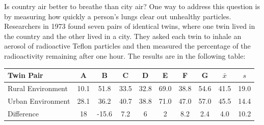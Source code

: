 \documentclass[11pt]{exam}
\begin{document}
\begin{questions}



\newpage

\question Is country air better to breathe than city air? One way to address this question is by measuring how quickly a person's lungs clear out unhealthy particles.  Researchers in 1973 found seven pairs of identical twins, where one twin lived in the country and the other lived in a city.  They asked each twin to inhale an aerosol of radioactive Teflon particles and then measured the percentage of the radioactivity remaining after one hour.  The results are in the following table:

\begin{center}
\begin{tabular}{l|ccccccc|cc}
Twin Pair & A & B & C & D & E & F & G & $\bar{x}$ & $s$ \\ \hline
Rural Environment & 10.1 & 51.8 & 33.5 & 32.8 & 69.0 & 38.8 & 54.6 & 41.5 & 19.0 \\
Urban Environment & 28.1 & 36.2 & 40.7 & 38.8 & 71.0 & 47.0 & 57.0 & 45.5 & 14.4 \\ \hline
Difference & 18 & -15.6 & 7.2 & 6 & 2 & 8.2 & 2.4 & 4.0 & 10.2 \\
\end{tabular}
\end{center}


\end{questions}
\end{document}
